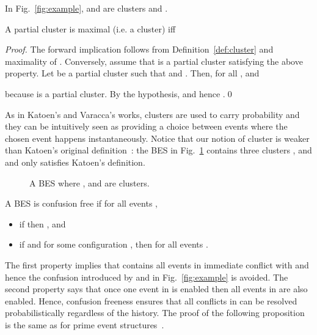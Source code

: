 \documentclass{llncs}
\newcommand{\<}{\langle}
\renewcommand{\>}{\rangle}
\begin{document}
\begin{example}
In Fig.~\ref{fig:example},  and  are clusters and . 
\end{example}

\begin{proposition}
A partial cluster  is maximal (i.e. a cluster) iff

\end{proposition}

\begin{proof}
The forward implication follows from Definition~\ref{def:cluster} and maximality of .
Conversely, assume that  is a partial cluster satisfying the above property. Let  be a partial cluster such that  and . Then, for all ,  and 
 
because  is a partial cluster. By the hypothesis,  and hence .\qed
\end{proof}

As in Katoen's and Varacca's works, clusters are used to carry probability and they can be intuitively seen as providing a choice between events where the chosen event happens instantaneously. Notice that our notion of cluster is weaker than Katoen's original definition~\cite{Kat96}: the BES in Fig.~\ref{fig:not-katoen-cluster} contains three clusters ,  and  and only  satisfies Katoen's definition.\\
\begin{figure}[h!]

\caption{A BES where ,  and  are clusters.}\label{fig:not-katoen-cluster}
\end{figure}

\begin{definition}\label{def:confusion-free}
A BES  is confusion free if for all events , 
\begin{itemize} 
\item if  then , and
\item  if  and  for some configuration , then  for all events .
\end{itemize}
\end{definition}
The first property implies that  contains all events in immediate conflict with  and hence the confusion introduced by  and  in Fig.~\ref{fig:example} is avoided. The second property says that once one event in  is enabled then all events in  are also enabled. 
Hence, confusion freeness ensures that all conflicts in  can be resolved probabilistically regardless of the history. The proof of the following proposition is the same as for prime event structures~\cite{Var03}.
\end{document}
